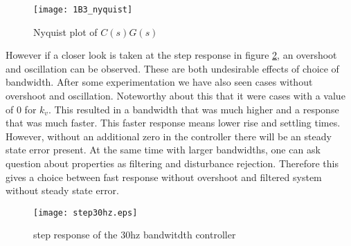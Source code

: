 \documentclass[report.tex]{subfiles}
\begin{document}
\begin{figure}[H] 
	\texttt{[image: 1B3\_nyquist]}
	\centering
	\caption{Nyquist plot of $C(s)G(s)$}
	\label{fig:1B3_nyquist}
\end{figure}

However if a closer look is taken at the step response in figure \ref{fig:step30hz}, an overshoot and oscillation can be observed. These are both undesirable effects of choice of bandwidth. After some experimentation we have also seen cases without overshoot and oscillation. Noteworthy about this that it were cases with a value of 0 for $k_v$. This resulted in a bandwidth that was much higher and a response that was much faster. This faster response means lower rise and settling times. However, without an additional zero in the controller there will be an steady state error present. At the same time with larger bandwidths, one can ask question about properties as filtering and disturbance rejection. Therefore this gives a choice between fast response without overshoot and filtered system without steady state error. 

\begin{figure}[H] 
	\texttt{[image: step30hz.eps]}
	\centering
	\caption{step response of the 30hz bandwitdth controller}
	\label{fig:step30hz}
\end{figure}
\end{document}
